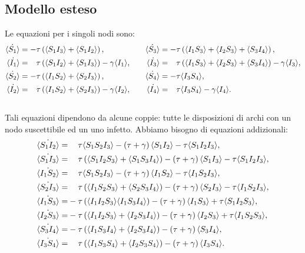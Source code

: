 \subsection{Modello esteso}\label{lollipop_completo}
Le equazioni per i singoli nodi sono:
 \begin{equation*}
 \begin{aligned}
 \dot{\angol{S_1}}&= -\tau \tonde{ \angol{ S_1 I_3} + \angol{S_1 I_2}},  \quad 
 &\dot{\angol{S_3}}&= -\tau \tonde{ \angol{I_1 S_3} + \angol{I_2 S_3}+ \angol{S_3 I_4}},  \\
 \dot{\angol{I_1}}&= \spa \tau \tonde{ \angol{ S_1 I_2} + \angol{S_1 I_3}} - \gamma\angol{I_1},\quad 
 &\dot{\angol{I_3}}&= \spa \tau \tonde{ \angol{I_1 S_3} + \angol{I_2 S_3}+ \angol{S_3 I_4}}-\gamma\angol{I_3},\\
 \dot{\angol{S_2}}&= -\tau \tonde{ \angol{ I_1 S_2} + \angol{S_2 I_3}}, \quad &\dot{\angol{S_4}} &= -\tau \angol{I_3S_4},  \\
 \dot{\angol{I_2}}&= \spa \tau \tonde{ \angol{ I_1 S_2} + \angol{S_2 I_3}} - \gamma\angol{I_2},\quad & \dot{\angol{I_4}}&=\spa \tau\angol{I_3S_4}-\gamma\angol{I_4}. \\\
 \end{aligned}	
 \end{equation*}
 Tali equazioni dipendono da alcune coppie: tutte le disposizioni di archi con un nodo suscettibile ed un uno infetto. Abbiamo bisogno di equazioni addizionali:
 \begin{equation*}
 \begin{aligned}
 \dot{\angol{S_1I_2}} =&\spa \tau\angol{S_1S_2I_3} - \tonde{ \tau + \gamma} \angol{S_1 I_2} -\tau\angol{S_1I_2I_3},\\
 \dot{\angol{S_1I_3}}=&\spa \tau\tonde{ \angol{S_1I_2S_3} + \angol{S_1S_3I_4}} - \tonde{ \tau +\gamma}\angol{S_1 I_3} -\tau \angol{ S_1 I_2 I_3},\\
 \dot{\angol{I_1S_2}} =&\spa\tau\angol{S_1S_2I_3} - \tonde{ \tau + \gamma} \angol{I_1 S_2} -\tau\angol{I_1S_2I_3},\\
\dot{\angol{S_2I_3}} =&\spa \tau\tonde{\angol{I_1S_2S_3} +{\angol{S_2S_3I_4}}} - \tonde{ \tau + \gamma} \angol{S_2 I_3} -\tau\angol{I_1S_2I_3},\\
 \dot{\angol{I_1S_3}} =&- \tau\tonde{\angol{I_1I_2S_3} \angol{I_1S_3I_4}} - \tonde{ \tau + \gamma} \angol{I_1 S_3} +\tau\angol{S_1I_2S_3},\\ 
\dot{\angol{I_2S_3}} =&- \tau\tonde{\angol{I_1I_2S_3} +\angol{I_2S_3I_4}} - \tonde{ \tau + \gamma} \angol{I_2 S_3} +\tau\angol{I_1S_2S_3},\\ 
 \dot{\angol{S_3I_4}} =&- \tau\tonde{\angol{I_1S_3I_4}+\angol{I_2S_3I_4}} - \tonde{ \tau + \gamma} \angol{S_3 I_4}, \\ 
    \dot{\angol{I_3S_4}} =& \spa \tau\tonde{\angol{I_1S_3S_4}+\angol{I_2S_3S_4}} - \tonde{ \tau + \gamma} \angol{I_3 S_4}.\\ 
\end{aligned}
 \end{equation*}
